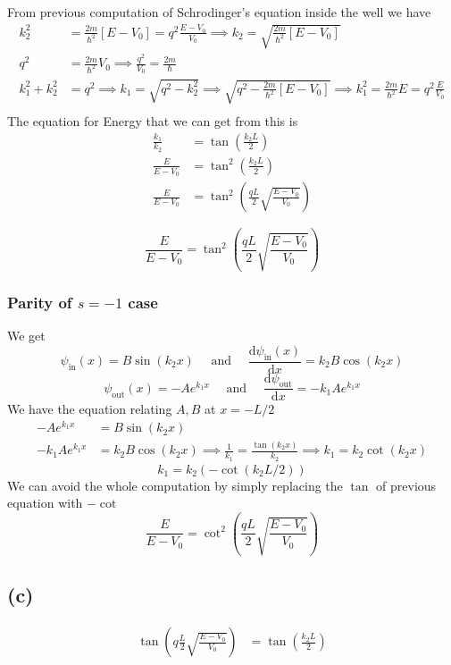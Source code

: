 \documentclass[letterpaper]{article}
\newcommand{\hb}{\hbar}
\begin{document}
From previous computation of Schrodinger's equation inside the well we have 
\begin{align*}
	k_2^2 &= \frac{2m}{\hb^2}[E - V_0] = q^2 \frac{E - V_0}{V_0} \implies
	k_2 = \sqrt{
\frac{2m}{\hb^2}[E - V_0] 
	}\\
	q^2 &= \frac{2m}{\hb ^2} V_0 \implies \frac{q^2}{V_0} = \frac{2m }{\hb} \\ 
	k_1^2 + k_2^2 &= q^2 \implies
k_1 = \sqrt{q^2 - k_2^2}  \implies  
\sqrt{q^2 - \frac{2m}{\hb^2}[E - V_0]} 
\implies k_1 ^2 = \frac{2m}{\hb ^2} E = q^2 \frac{E}{V_0} \\ 
\end{align*}
The equation for Energy that we can get from this is 
\begin{align*}
	\frac{k_1}{k_2} &= \tan \left( \frac{k_2 L}{2}\right) \\ 
	\frac{E}{E - V_0} &= \tan ^2 \left( \frac{k_2 L}{2}\right) \\
	\frac{E }{E - V_0} &= \tan ^2 \left(
\frac{qL}{2} \sqrt{\frac{E - V_0}{V_0}} 
\right)
\end{align*}

\[
\boxed{
	\frac{E }{E - V_0} = \tan ^2 \left(
\frac{qL}{2} \sqrt{\frac{E - V_0}{V_0}} 
\right)}
\] 

\subsubsection*{Parity of $s = -1$ case} 
We get 
\[
\psi_\text{in}(x) =  B \sin(k_2 x) \quad \text{ and } \quad \frac{\mathrm{d} \psi_\text{in}(x)}{\mathrm{d}x } = k_2 B \cos(k_2 x)
\]
\[
\psi_\text{out} (x) = - A e^{ k_1 x} \quad \text{ and } \quad \frac{\mathrm{d} \psi_\text{out}}{\mathrm{d} x} = - k_1 A e^{k_1 x}
\] 
We have the equation relating $A,B$ at $x = - L /2 $
\begin{align*}
	- A e^{k_1 x} &= B \sin (k_2 x)	 \\
	-k_1 A e^{k_1 x} &= k_2 B \cos(k_2 x)  \implies
	\frac{1}{k_1} = \frac{\tan(k_2 x)}{k_2} \implies 
	k_1 = k_2 \cot \left(k_2 x\right)
\end{align*}
\[
k_1 = k_2 (- \cot(k_2 L / 2))
\]
We can avoid the whole computation by simply replacing the $\tan$ of previous equation with $- \cot $ 
\[
\boxed{
\frac{E}{E - V_0} = \cot^2 \left(\frac{q L}{2} \sqrt{\frac{E - V_0}{V_0}} \right)
}
\] 

\subsection*{(c)} 
\begin{align*}
	\tan \left(q \frac{L}{2} \sqrt{\frac{E-V_0}{V_0}} \right) &= 
	\tan \left( \frac{k_2 L}{2}\right)\\ 
\end{align*}
\end{document}
